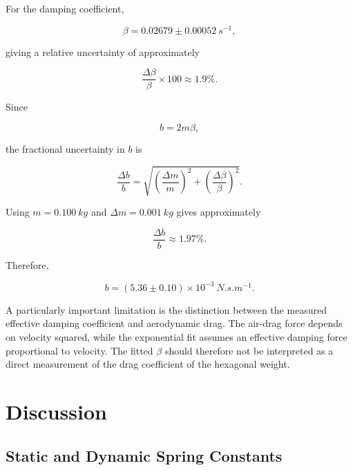 \documentclass[12pt,a4paper]{article}
\begin{document}
For the damping coefficient,

\begin{equation}
\beta=0.02679\pm0.00052\ \si{s^{-1}},
\end{equation}

giving a relative uncertainty of approximately

\begin{equation}
\frac{\Delta\beta}{\beta}
\times100
\approx1.9\%.
\end{equation}

Since

\begin{equation}
b=2m\beta,
\end{equation}

the fractional uncertainty in $b$ is

\begin{equation}
\frac{\Delta b}{b}
=
\sqrt{
\left(\frac{\Delta m}{m}\right)^2+
\left(\frac{\Delta\beta}{\beta}\right)^2
}.
\end{equation}

Using $m=\SI{0.100}{kg}$ and $\Delta m=\SI{0.001}{kg}$ gives approximately

\begin{equation}
\frac{\Delta b}{b}
\approx1.97\%.
\end{equation}

Therefore,

\begin{equation}
b=(5.36\pm0.10)\times10^{-3}
\ \si{N.s.m^{-1}}.
\end{equation}


A particularly important limitation is the distinction between the measured effective damping coefficient and aerodynamic drag. The air-drag force depends on velocity squared, while the exponential fit assumes an effective damping force proportional to velocity. The fitted $\beta$ should therefore not be interpreted as a direct measurement of the drag coefficient of the hexagonal weight.

\section{Discussion}

\subsection{Static and Dynamic Spring Constants}
\end{document}
